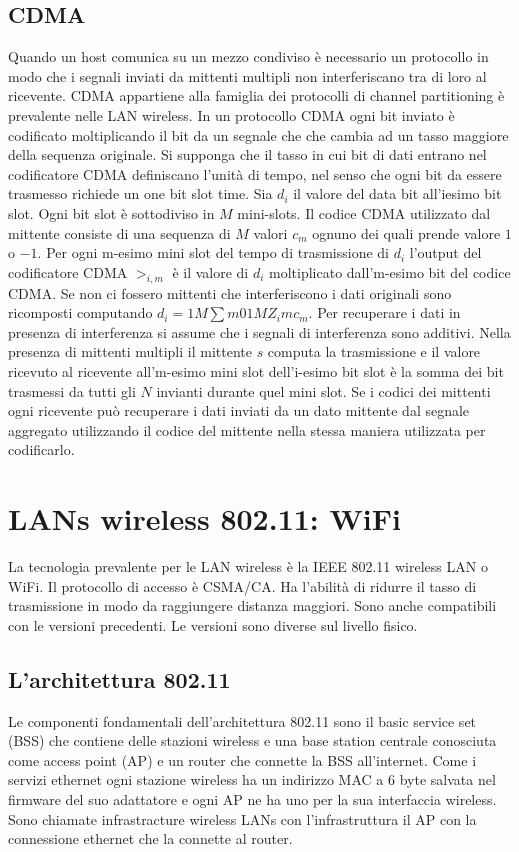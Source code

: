 \subsection{CDMA}
Quando un host comunica su un mezzo condiviso \`e necessario un protocollo  in modo che i segnali inviati da mittenti multipli non interferiscano tra di loro al ricevente. CDMA appartiene alla famiglia dei
protocolli di channel partitioning \`e prevalente nelle LAN wireless. In un protocollo CDMA ogni bit inviato \`e codificato moltiplicando il bit da un segnale che che cambia ad un tasso maggiore della sequenza 
originale. Si supponga che il tasso in cui bit di dati entrano nel codificatore CDMA definiscano l'unit\`a di tempo, nel senso che ogni bit da essere trasmesso richiede un one bit slot time. Sia $d_i$ il valore del
data bit all'iesimo bit slot. Ogni bit slot \`e sottodiviso in $M$ mini-slots. Il codice CDMA utilizzato dal mittente consiste di una sequenza di $M$ valori $c_m$ ognuno dei quali prende valore $1$ o $-1$. Per
ogni m-esimo mini slot del tempo di trasmissione di $d_i$ l'output del codificatore CDMA $>_{i,m}$ \`e il valore di $d_i$ moltiplicato dall'm-esimo bit del codice CDMA. Se non ci fossero mittenti che
interferiscono i dati originali sono ricomposti computando $d_i=1M\sum m 01MZ_imc_m$. Per recuperare i dati in presenza di interferenza si assume che i segnali di interferenza sono additivi. Nella presenza 
di mittenti multipli il mittente $s$ computa la trasmissione e il valore ricevuto al ricevente all'm-esimo mini slot dell'i-esimo bit slot \`e la somma dei bit trasmessi da tutti gli $N$ invianti durante quel mini slot.
Se i codici dei mittenti ogni ricevente pu\`o recuperare i dati inviati da un dato mittente dal segnale aggregato utilizzando il codice del mittente nella stessa maniera utilizzata per codificarlo. 
\section{LANs wireless 802.11: WiFi}
La tecnologia prevalente per le LAN wireless \`e la IEEE 802.11 wireless LAN o WiFi. Il protocollo di accesso \`e CSMA/CA. Ha l'abilit\`a di ridurre il tasso di trasmissione in modo da raggiungere distanza 
maggiori. Sono anche compatibili con le versioni precedenti. Le versioni sono diverse sul livello fisico. 
\subsection{L'architettura 802.11}
Le componenti fondamentali dell'architettura 802.11 sono il basic service set (BSS) che contiene delle stazioni wireless e una base station centrale conosciuta come access point (AP) e un router che connette la
BSS all'internet. Come i servizi ethernet ogni stazione wireless ha un indirizzo MAC a 6 byte salvata nel firmware del suo adattatore e ogni AP ne ha uno per la sua interfaccia wireless. Sono chiamate 
infrastracture wireless LANs con l'infrastruttura il AP con la connessione ethernet che la connette al router. 
